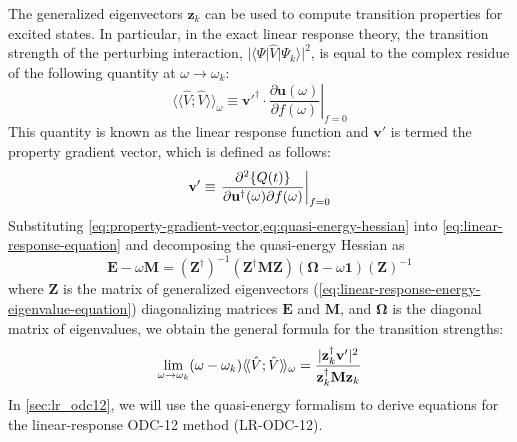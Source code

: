 The generalized eigenvectors \(\mathbf{z}_k\) can be used to
compute transition properties for excited states.
In particular, in the exact linear response theory,\cite{Olsen:1985p3235} the transition strength
of the perturbing interaction,
\(
    |\langle\Psi|\hat{V}|\Psi_k\rangle|^2
\),
is equal to the complex residue of the following quantity at
\(\omega\rightarrow\omega_k\):
\begin{equation}
    \langle\!\langle \hat{V}; \hat{V} \rangle\!\rangle_\omega
    \equiv
    \left.
    \mathbf{v}'^\dagger
    \cdot
    \frac{\partial \mathbf{u}(\omega)}{\partial f(\omega)}
    \right|_{f=0}
\end{equation}
This quantity is known as the linear response function and
\(
    \mathbf{v}'
\)
is termed the property gradient vector,\cite{Sauer:2011} which is defined as
follows:
\begin{equation}
    \label{eq:property-gradient-vector}
    \mathbf{v}'
    \equiv
    \left.
    \frac{%
        \partial^2 \{Q(t)\}
    }{%
        \partial \mathbf{u}^\dagger(\omega)
        \partial f(\omega)
    }
    \right|_{f=0}
\end{equation}
Substituting \cref{eq:property-gradient-vector,eq:quasi-energy-hessian} into
\cref{eq:linear-response-equation} and decomposing the quasi-energy Hessian as
\begin{equation}
    \mathbf{E} - \omega\mathbf{M}
    =
    (\mathbf{Z}^\dagger)^{-1}
    (\mathbf{Z}^\dagger \mathbf{M} \mathbf{Z})
    (\boldsymbol\Omega - \omega\mathbf{1})
    (\mathbf{Z})^{-1}
\end{equation}
where \(\mathbf{Z}\) is the matrix of generalized eigenvectors
(\cref{eq:linear-response-energy-eigenvalue-equation}) diagonalizing
matrices \(\mathbf{E}\) and \(\mathbf{M}\), and \(\boldsymbol\Omega\) is the diagonal
matrix of eigenvalues, we obtain the general formula for the transition
strengths:
\begin{equation}
    \lim_{\omega\rightarrow \omega_k}
    (\omega-\omega_k)
    \langle\!\langle \hat{V}; \hat{V} \rangle\!\rangle_\omega
    =
    \frac{%
        |\mathbf{z}_k^\dagger \mathbf{v}'|^2
    }{%
        \mathbf{z}_k^\dagger \mathbf{M}\mathbf{z}_k
    }
\end{equation}
In \cref{sec:lr_odc12}, we will use the quasi-energy formalism to derive
equations for the linear-response ODC-12 method (LR-ODC-12).


